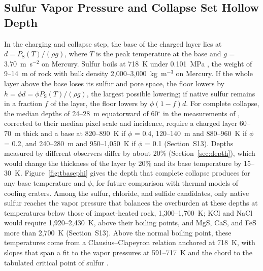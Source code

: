 \documentclass[article,review]{planetary}
\begin{document}
\subsection{Sulfur Vapor Pressure and Collapse Set Hollow Depth}
\label{sec:depthcontrol}
In the charging and collapse step, the base of the charged layer lies at $d = P_{\mathrm{S}}(T)/(\rho g)$, where $T$ is the peak temperature at the base and $g$ = 3.70~m~s$^{-2}$ on Mercury. Sulfur boils at 718~K under 0.101~MPa \parencite{lide2007}, the weight of 9--14~m of rock with bulk density 2,000--3,000~kg~m$^{-3}$ on Mercury. If the whole layer above the base loses its sulfur and pore space, the floor lowers by $h = \phi d = \phi P_{\mathrm{S}}(T)/(\rho g)$, the largest possible lowering; if native sulfur remains in a fraction $f$ of the layer, the floor lowers by $\phi(1-f)d$. For complete collapse, the median depths of 24--28~m equatorward of 60$^\circ$ in the measurements of \textcite{blewett2016}, corrected to their median pixel scale and incidence, require a charged layer 60--70~m thick and a base at 820--890~K if $\phi$ = 0.4, 120--140~m and 880--960~K if $\phi$ = 0.2, and 240--280~m and 950--1,050~K if $\phi$ = 0.1 (Section~S13). Depths measured by different observers differ by about 20\% (Section~\ref{sec:depth}), which would change the thickness of the layer by 20\% and its base temperature by 15--30~K. Figure~\ref{fig:tbasephi} gives the depth that complete collapse produces for any base temperature and $\phi$, for future comparison with thermal models of cooling craters. Among the sulfur, chloride, and sulfide candidates, only native sulfur reaches the vapor pressure that balances the overburden at these depths at temperatures below those of impact-heated rock, 1,300--1,700~K; KCl and NaCl would require 1,920--2,430~K, above their boiling points, and MgS, CaS, and FeS more than 2,700~K (Section~S13). Above the normal boiling point, these temperatures come from a Clausius--Clapeyron relation anchored at 718~K, with slopes that span a fit to the vapor pressures at 591--717~K and the chord to the tabulated critical point of sulfur \parencite[1,314~K, 20.7~MPa;][]{lide2007}.
\end{document}
